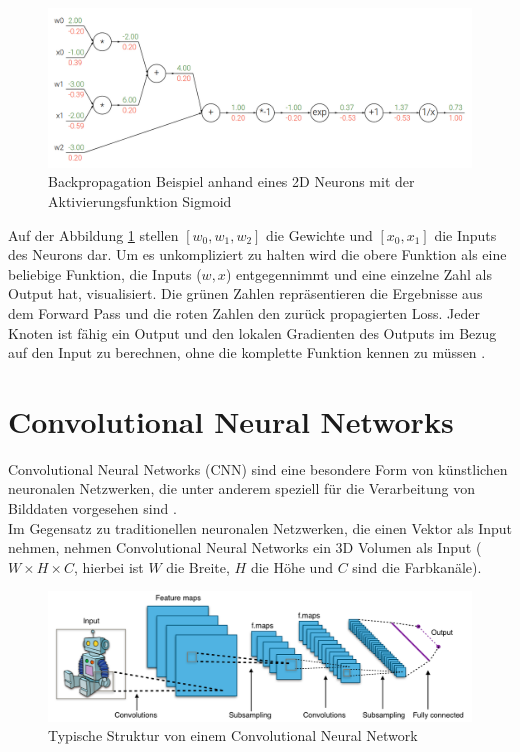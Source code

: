\begin{figure}[H]
  \centering
  \includegraphics[width=1\textwidth]{resources/cnn/backpropagation.png}
  \caption{
    Backpropagation Beispiel anhand eines 2D Neurons mit der Aktivierungsfunktion Sigmoid
    \cite{backpropagation}
  }
  \label{image:backpropagation}
\end{figure}

Auf der Abbildung \ref{image:backpropagation} stellen $ [w_0, w_1, w_2] $ die Gewichte und $ [x_0, x_1] $ die Inputs des Neurons dar.
Um es unkompliziert zu halten wird die
obere Funktion als eine beliebige Funktion, die Inputs ($w, x$) entgegennimmt und eine einzelne Zahl als Output hat, visualisiert.
Die grünen Zahlen repräsentieren die Ergebnisse aus dem Forward Pass und die roten Zahlen den zurück propagierten Loss. Jeder Knoten ist fähig
ein Output und den lokalen Gradienten des Outputs im Bezug auf den Input zu berechnen, ohne die komplette Funktion kennen zu müssen \cite{cs231-backpropagation}.

\section{Convolutional Neural Networks}
Convolutional Neural Networks (\gls{CNN}) sind eine besondere Form von künstlichen neuronalen Netzwerken, die unter anderem speziell für
die Verarbeitung von Bilddaten vorgesehen sind \cite{convnet-erklaerung}.
\\
Im Gegensatz zu traditionellen neuronalen Netzwerken, die einen Vektor als Input nehmen, nehmen Convolutional Neural Networks ein 3D Volumen als Input
($ W \times H \times C $, hierbei ist $W$ die Breite, $H$ die Höhe und $C$ sind die Farbkanäle).

\begin{figure}[H]
  \centering
  \includegraphics[width=1\textwidth]{resources/cnn/typical_cnn.png}
  \caption{
    Typische Struktur von einem Convolutional Neural Network
    \cite{typical_cnn_img}
  }
  \label{image:typical_cnn_img}
\end{figure}


